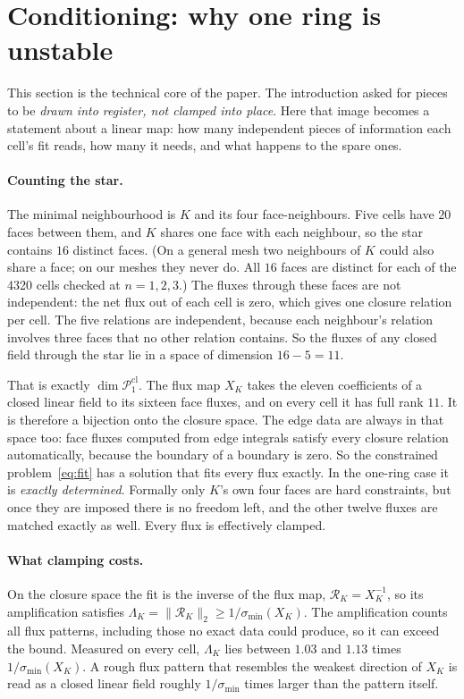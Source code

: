 \documentclass[11pt]{article}
\theoremstyle{definition}
\theoremstyle{remark}
\newcommand{\cR}{\mathcal{R}}
\newcommand{\norm}[1]{\lVert #1\rVert}
\newcommand{\Pone}{\mathcal{P}_1^{\mathrm{cl}}}
\begin{document}
\section{Conditioning: why one ring is unstable}\label{sec:conditioning}

This section is the technical core of the paper. The introduction asked for pieces to be
\emph{drawn into register, not clamped into place}. Here that image becomes a statement
about a linear map: how many independent pieces of information each cell's fit reads, how
many it needs, and what happens to the spare ones.

\paragraph{Counting the star.} The minimal neighbourhood is $K$ and its four
face-neighbours. Five cells have $20$ faces between them, and $K$ shares one face with
each neighbour, so the star contains $16$ distinct faces. (On a general mesh two
neighbours of $K$ could also share a face; on our meshes they never do. All $16$ faces
are distinct for each of the 4320 cells checked at $n=1,2,3$.) The fluxes through
these faces are not independent: the net flux out of each cell is zero, which gives one
closure relation per cell. The five relations are independent, because each neighbour's
relation involves three faces that no other relation contains. So the fluxes of any
closed field through the star lie in a space of dimension $16-5=11$.

That is exactly $\dim\Pone$. The flux map $X_K$ takes the eleven coefficients of a
closed linear field to its sixteen face fluxes, and on every cell it has full rank $11$.
It is therefore a bijection onto the closure space. The edge data are always in that
space too: face fluxes computed from edge integrals satisfy every closure relation
automatically, because the boundary of a boundary is zero. So the constrained
problem~\eqref{eq:fit} has a solution that fits every flux exactly. In the one-ring
case it is \emph{exactly determined}. Formally only $K$'s own four faces are hard
constraints, but once they are imposed there is no freedom left, and the other twelve
fluxes are matched exactly as well. Every flux is effectively clamped.

\paragraph{What clamping costs.} On the closure space the fit is the inverse of the
flux map, $\cR_K = X_K^{-1}$, so its amplification satisfies
$\Lambda_K = \norm{\cR_K}_2 \ge 1/\sigma_{\min}(X_K)$. The amplification counts all
flux patterns, including those no exact data could produce, so it can exceed the bound.
Measured on every cell, $\Lambda_K$ lies between $1.03$ and
$1.13$ times $1/\sigma_{\min}(X_K)$. A rough flux pattern that resembles
the weakest direction of $X_K$ is read as a closed linear field roughly
$1/\sigma_{\min}$ times larger than the pattern itself.
\end{document}
